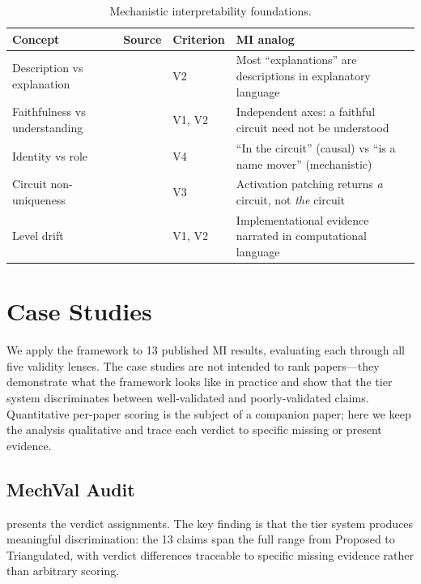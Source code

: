 \documentclass{article}
\begin{document}
\begin{table}[H]
\centering\small
\caption{Mechanistic interpretability foundations.}
\renewcommand{\arraystretch}{1.12}
\begin{tabular}{@{}l>{\raggedright\arraybackslash}p{2.2cm}l>{\raggedright\arraybackslash}p{4.5cm}@{}}
\toprule
\textbf{Concept} & \textbf{Source} & \textbf{Criterion} & \textbf{MI analog} \\
\midrule
Description vs explanation & \citet{olsson2022context} & V2 & Most ``explanations'' are descriptions in explanatory language \\
\midrule
Faithfulness vs understanding & \citet{wang2023interpretability} & V1, V2 & Independent axes: a faithful circuit need not be understood \\
\midrule
Identity vs role & \citet{wang2023interpretability} & V4 & ``In the circuit'' (causal) vs ``is a name mover'' (mechanistic) \\
\midrule
Circuit non-uniqueness & \citet{meloux2025everything} & V3 & Activation patching returns \emph{a} circuit, not \emph{the} circuit \\
\midrule
Level drift & \citet{marr1982vision} & V1, V2 & Implementational evidence narrated in computational language \\
\bottomrule
\end{tabular}
\end{table}

\section{Case Studies}
\label{sec:case-studies}

We apply the framework to 13 published MI results, evaluating each through all five validity lenses. The case studies are not intended to rank papers---they demonstrate what the framework looks like in practice and show that the tier system discriminates between well-validated and poorly-validated claims. Quantitative per-paper scoring is the subject of a companion paper; here we keep the analysis qualitative and trace each verdict to specific missing or present evidence.

\subsection{MechVal Audit}

 presents the verdict assignments. The key finding is that the tier system produces meaningful discrimination: the 13 claims span the full range from Proposed to Triangulated, with verdict differences traceable to specific missing evidence rather than arbitrary scoring.
\end{document}
